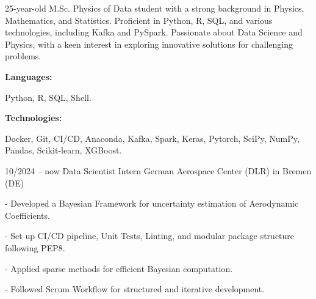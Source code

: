 \documentclass[9pt]{developercv} %
\begin{document}

\begin{minipage}[t]{0.46\textwidth}
	\vspace{-6pt}
 
	25-year-old M.Sc. Physics of Data student with a strong background in Physics, Mathematics, and Statistics. Proficient in Python, R, SQL, and various technologies, including Kafka and PySpark. Passionate about Data Science and Physics, with a keen interest in exploring innovative solutions for challenging problems.\\
 
\end{minipage}
\hfill %
\begin{minipage}[t]{0.465\textwidth}
    \vspace{-6pt}
    
    \begin{minipage}[t]{0.2\textwidth}
        \textbf{Languages:}
    \end{minipage}
    \hfill
    \begin{minipage}[t]{0.73\textwidth}
      Python, R, SQL, Shell.  
    \end{minipage}
    \vspace{4mm}
    
    \begin{minipage}[t]{0.2\textwidth}
        \textbf{Technologies:}
    \end{minipage}
    \hfill
    \begin{minipage}[t]{0.73\textwidth}
      Docker, Git, CI/CD, Anaconda, Kafka, Spark, Keras, Pytorch, SciPy, NumPy, Pandas, Scikit-learn, XGBoost.
    \end{minipage}
    
\end{minipage}


\vspace{-10 pt}
\begin{entrylist}
	\entry
        {10/2024 -- now}
		{Data Scientist Intern}
		{German Aerospace Center (DLR) in Bremen (DE)}
            {- Developed a Bayesian Framework for uncertainty estimation of Aerodynamic Coefficients. 
            
            - Set up CI/CD pipeline, Unit Tests, Linting, and modular package structure following PEP8.
            
            - Applied sparse methods for efficient Bayesian computation.
            
            - Followed Scrum Workflow for structured and iterative development.}
		
\end{entrylist}
\end{document}
